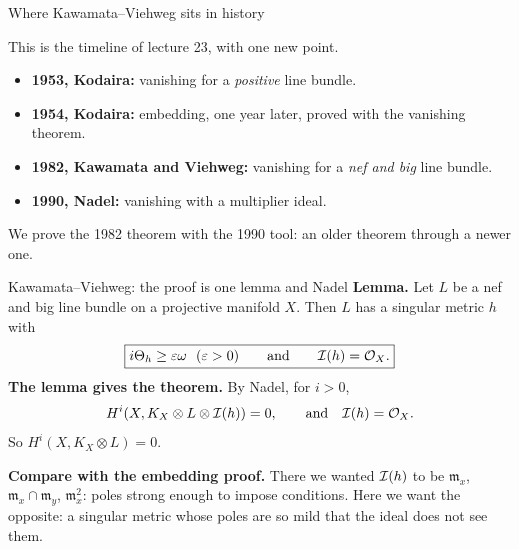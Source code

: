 \begin{frame}{Where Kawamata--Viehweg sits in history}
\label{fr:kv-timeline}
\begin{center}
\end{center}
\par\medskip
This is the timeline of lecture 23, with one new point.
\par\smallskip
\begin{itemize}
\setlength{\itemsep}{6pt}
\item \textbf{1953, Kodaira:} vanishing for a \emph{positive} line bundle.
\item \textbf{1954, Kodaira:} embedding, one year later, proved with the vanishing theorem.
\item \textbf{1982, Kawamata and Viehweg:} vanishing for a \emph{nef and big} line bundle.
\item \textbf{1990, Nadel:} vanishing with a multiplier ideal.
\end{itemize}
\par\medskip
We prove the 1982 theorem with the 1990 tool: an older theorem through a newer one.
\end{frame}

\begin{frame}{Kawamata--Viehweg: the proof is one lemma and Nadel}
\label{fr:kv-proof-1}
\textbf{Lemma.} Let \(L\) be a nef and big line bundle on a projective manifold \(X\). Then \(L\) has a singular metric \(h\) with
\[
\boxed{i\Theta_h\ge\varepsilon\omega\ \ (\varepsilon>0)\qquad\text{and}\qquad\cI(h)=\cO_X .}
\]
\textbf{The lemma gives the theorem.} By Nadel, for \(i>0\),
\[
H^i(X,K_X\otimes L\otimes\mathcal I(h))=0,\qquad\text{and}\quad\mathcal I(h)=\mathcal O_X .
\]
So \(H^i(X,K_X\otimes L)=0\).
\par\bigskip
\textbf{Compare with the embedding proof.} There we wanted \(\mathcal I(h)\) to be \(\mathfrak m_x\), \(\mathfrak m_x\cap\mathfrak m_y\), \(\mathfrak m_x^2\): poles strong enough to impose conditions. Here we want the opposite: a singular metric whose poles are so mild that the ideal does not see them.
\end{frame}

